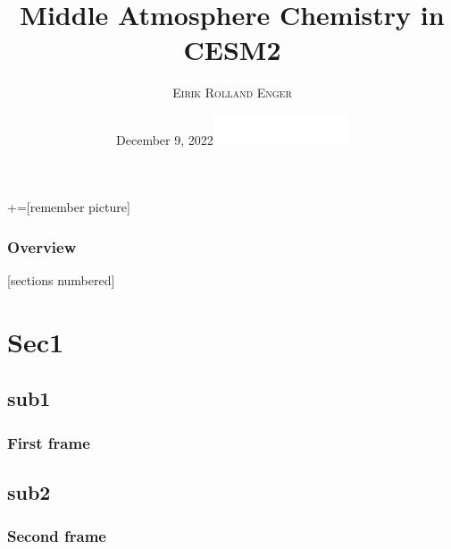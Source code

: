 \documentclass[xcolor=dvipsnames]{beamer} %
\title[MA in CESM2]{Middle Atmosphere Chemistry in CESM2}
\author{\textsc{Eirik Rolland Enger}}
\date{\vspace{-3mm}December 9, 2022\hfill\includegraphics[width=4cm]{utils/CSU-Official-wrdmrk-Rev-2.png}}
\begin{document}
\maketitle

+=[remember picture]
\everymath{\displaystyle}

\begin{frame}%
  \frametitle{Overview}

  [sections numbered]
  \tableofcontents[hideallsubsections]

\end{frame}

\section{Sec1}
\subsection{sub1}

\begin{frame}
  \frametitle{First frame}
\end{frame}

\subsection{sub2}

\begin{frame}
  \frametitle{Second frame}
\end{frame}

\appendix
% 


\end{document}
